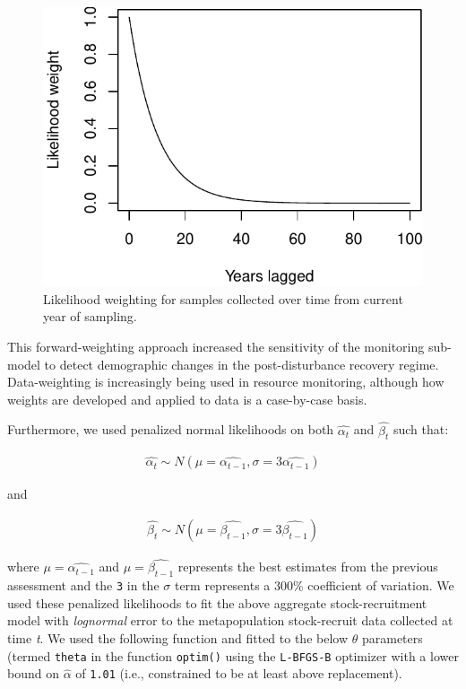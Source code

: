 \documentclass[
]{article}
\begin{document}
\begin{figure}[H]

{\centering \includegraphics{Managing_for_ecological_surprises_in_metapopulations_files/figure-latex/unnamed-chunk-1-1} 

}

\caption{Likelihood weighting for samples collected over time from current year of sampling.}\label{fig:unnamed-chunk-1}
\end{figure}

This forward-weighting approach increased the sensitivity of the
monitoring sub-model to detect demographic changes in the
post-disturbance recovery regime. Data-weighting is increasingly being
used in resource monitoring, although how weights are developed and
applied to data is a case-by-case basis.

Furthermore, we used penalized normal likelihoods on both
\(\hat{\alpha_t}\) and \(\hat{\beta_t}\) such that:

\begin{align}
\hat{\alpha_t} \sim N(\mu=\hat{\alpha_{t-1}},\sigma=3\hat{\alpha_{t-1}})
\end{align}

and

\begin{align}
\hat{\beta_t} \sim N(\mu=\hat{\beta_{t-1}},\sigma=3\hat{\beta_{t-1}})
\end{align}

where \(\mu=\hat{\alpha_{t-1}}\) and \(\mu=\hat{\beta_{t-1}}\)
represents the best estimates from the previous assessment and the
\texttt{3} in the \(\sigma\) term represents a 300\% coefficient of
variation. We used these penalized likelihoods to fit the above
aggregate stock-recruitment model with \emph{lognormal} error to the
metapopulation stock-recruit data collected at time \emph{t}. We used
the following function and fitted to the below \(\theta\) parameters
(termed \texttt{theta} in the function \texttt{optim()} using the
\texttt{L-BFGS-B} optimizer with a lower bound on \(\hat{\alpha}\) of
\texttt{1.01} (i.e., constrained to be at least above replacement).
\end{document}
